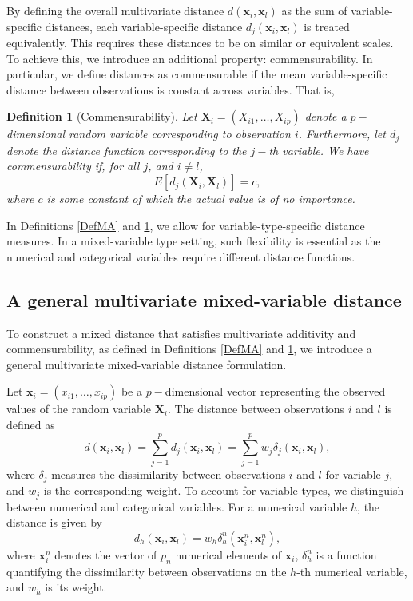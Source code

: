 \documentclass[12pt]{article}
\newtheorem{definition}{Definition}
\begin{document}
By defining the overall multivariate distance $d(\mathbf{x}_i,\mathbf{x}_l)$ as the sum of variable-specific distances, each variable-specific distance $d_j(\mathbf{x}_i,\mathbf{x}_l)$ is treated equivalently. This requires these distances to be on similar or equivalent scales. To achieve this, we introduce an additional property: commensurability. In particular, we define distances as commensurable if the mean variable-specific distance between observations is constant across variables. That is,

\begin{definition}[Commensurability]  \label{DefCom}
Let $\bm{X}_i =(X_{i1}, \dots, X_{ip})$ denote a $p-$dimensional random variable corresponding to observation $i$. Furthermore, let $d_{j}$ denote the distance function corresponding to the $j-$th variable. We have commensurability if,
for all $j$, and $i \neq l$,
\begin{equation*}
    E[d_{j}(\bm{X}_i, \bm{X}_l)] = c,
\end{equation*}
where $c$ is some constant of which the actual value is of no importance.
\end{definition}

In Definitions \ref{DefMA} and \ref{DefCom},  we allow for variable-type-specific distance measures. In a mixed-variable type setting, such flexibility is essential as the numerical and categorical variables require different distance functions.

\subsection{A general multivariate mixed-variable distance} \label{proposal}
To construct a mixed distance that satisfies multivariate additivity and commensurability, as defined in Definitions \ref{DefMA} and \ref{DefCom}, we introduce a general multivariate mixed-variable distance formulation.

Let $\mathbf{x}_i = (x_{i1}, \dots, x_{ip})$ be a $p-$dimensional vector representing the observed values of the random variable $\bm{X}_i$. The distance between observations $i$ and $l$ is defined as
\begin{equation}\label{genmixeddist}
d(\mathbf{x}_i, \mathbf{x}_l) = \sum_{j=1}^{p} d_j(\mathbf{x}_i, \mathbf{x}_l) = \sum_{j=1}^{p} w_j \delta_j(\mathbf{x}_i, \mathbf{x}_l),
\end{equation}
where $\delta_j$ measures the dissimilarity between observations $i$ and $l$ for variable $j$, and $w_j$ is the corresponding weight. To account for variable types, we distinguish between numerical and categorical variables. For a numerical variable $h$, the distance is given by
\begin{equation}\label{NumDist}
d_{h}(\mathbf{x}_i, \mathbf{x}_l) = w_{h} \delta_{h}^n(\mathbf{x}^n_{i}, \mathbf{x}^n_{l}),
\end{equation}
where $\mathbf{x}^n_{i}$ denotes the vector of $p_n$ numerical elements of $\mathbf{x}_{i}$, $\delta^n_{h}$ is a function quantifying the dissimilarity between observations on the $h$-th numerical variable, and $w_{h}$ is its weight.
\end{document}
